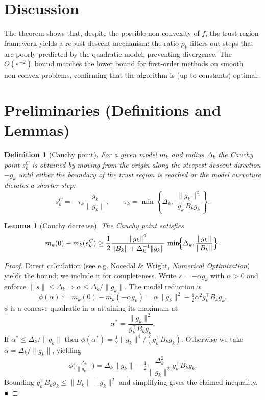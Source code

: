 \documentclass[11pt]{article}
\newtheorem{lemma}{Lemma}
\newtheorem{definition}{Definition}
\begin{document}
\section*{Discussion}
The theorem shows that, despite the possible non‑convexity of $f$, the trust‑region framework yields a robust descent mechanism: the ratio $\rho_{k}$ filters out steps that are poorly predicted by the quadratic model, preventing divergence.  The $O(\varepsilon^{-2})$ bound matches the lower bound for first‑order methods on smooth non‑convex problems, confirming that the algorithm is (up to constants) optimal.

\newpage
\section*{Preliminaries (Definitions and Lemmas)}
\begin{definition}[Cauchy point]\label{def:cauchy}
For a given model $m_{k}$ and radius $\Delta_{k}$ the Cauchy point $s_{k}^{C}$ is obtained by moving from the origin along the steepest descent direction $-g_{k}$ until either the boundary of the trust region is reached or the model curvature dictates a shorter step:
\[
s_{k}^{C}= -\tau_{k}\frac{g_{k}}{\|g_{k}\|},\qquad
\tau_{k}= \min\!\left\{\Delta_{k},\;\frac{\|g_{k}\|^{2}}{g_{k}^{\top}B_{k}g_{k}}\right\}.
\]
\end{definition}
\begin{lemma}[Cauchy decrease]\label{lem:cauchy}
The Cauchy point satisfies
\[
m_{k}(0)-m_{k}(s_{k}^{C})\ge \frac{1}{2}\frac{\|g_{k}\|^{2}}{\|B_{k}\|+ \Delta_{k}^{-1}\|g_{k}\|}\,
\min\!\Bigl\{\Delta_{k},\frac{\|g_{k}\|}{\|B_{k}\|}\Bigr\}.
\]
\end{lemma}
\begin{proof}
Direct calculation (see e.g. Nocedal \& Wright, \textit{Numerical Optimization}) yields the bound; we include it for completeness.  
Write $s=-\alpha g_{k}$ with $\alpha>0$ and enforce $\|s\|\le\Delta_{k}\Rightarrow \alpha\le\Delta_{k}/\|g_{k}\|$.  
The model reduction is
\[
\phi(\alpha):=m_{k}(0)-m_{k}(-\alpha g_{k}) = \alpha\|g_{k}\|^{2}-\tfrac12\alpha^{2}g_{k}^{\top}B_{k}g_{k}.
\]
$\phi$ is a concave quadratic in $\alpha$ attaining its maximum at
\[
\alpha^{*}= \frac{\|g_{k}\|^{2}}{g_{k}^{\top}B_{k}g_{k}} .
\]
If $\alpha^{*}\le\Delta_{k}/\|g_{k}\|$ then $\phi(\alpha^{*})=\tfrac12\|g_{k}\|^{4}/(g_{k}^{\top}B_{k}g_{k})$.
Otherwise we take $\alpha=\Delta_{k}/\|g_{k}\|$, yielding
\[
\phi\bigl(\tfrac{\Delta_{k}}{\|g_{k}\|}\bigr)=\Delta_{k}\|g_{k}\|- \tfrac12\frac{\Delta_{k}^{2}}{\|g_{k}\|^{2}}g_{k}^{\top}B_{k}g_{k}.
\]
Bounding $g_{k}^{\top}B_{k}g_{k}\le\|B_{k}\|\|g_{k}\|^{2}$ and simplifying gives the claimed inequality. ∎
\end{proof}
\end{document}
